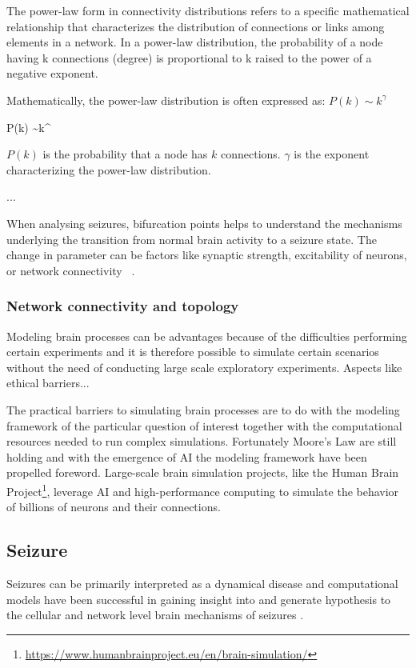 \documentclass[../../Orator.tex]{subfiles}
\begin{document}
The power-law form in connectivity distributions refers to a specific mathematical relationship that characterizes the distribution of connections or links among elements in a network. In a power-law distribution, the probability of a node having k connections (degree) is proportional to k raised to the power of a negative exponent.

Mathematically, the power-law distribution is often expressed as:
\(P(k)  \sim  k^\gamma\)
\begin{eqSystem}\label{eq:Power-law}
    P(k)  \sim  k^\gamma
\end{eqSystem}

$P(k)$ is the probability that a node has $k$ connections.
$\gamma$ is the exponent characterizing the power-law distribution.



...



When analysing seizures, bifurcation points helps to understand the mechanisms underlying the transition from normal brain activity to a seizure state. The change in parameter can be factors like synaptic strength, excitability of neurons, or network connectivity 
~\cite{gerstner2014neuronal}. 





    
\subsubsection{Network connectivity and topology}


Modeling brain processes can be advantages because of the difficulties  performing certain experiments and it is therefore possible to simulate certain scenarios without the need of conducting large scale exploratory experiments. Aspects like ethical barriers...

The practical barriers to simulating brain processes are to do with the modeling framework of the particular question of interest together with the computational resources needed to run complex simulations. Fortunately Moore's Law are still holding and with the emergence of AI the modeling framework have been propelled foreword. Large-scale brain simulation projects, like the Human Brain Project\footnote{\url{https://www.humanbrainproject.eu/en/brain-simulation/}}, leverage AI and high-performance computing to simulate the behavior of billions of neurons and their connections.


\subsection*{Seizure}
Seizures can be primarily interpreted as a dynamical disease \cite{da2003epilepsies, milton2010epilepsy} and computational models have been successful in gaining insight into and generate hypothesis to the cellular and network level brain mechanisms of seizures \cite{bazhenov2008cellular}.
\end{document}
